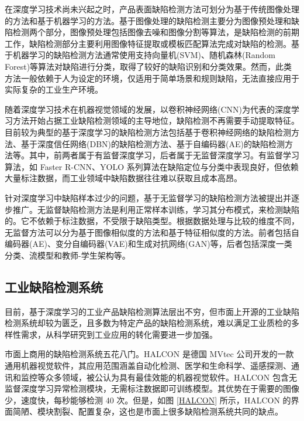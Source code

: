 \documentclass[
  ]{njuthesis}
\begin{document}
在深度学习技术尚未兴起之时，产品表面缺陷检测方法可划分为基于传统图像处理的方法和基于机器学习的方法。基于图像处理的缺陷检测主要分为图像预处理和缺陷检测两个部分，图像预处理包括图像去噪和图像分割等算法，是缺陷检测的前期工作，缺陷检测部分主要利用图像特征提取或模板匹配算法完成对缺陷的检测\cite{[4]}。基于机器学习的缺陷检测方法通常使用支持向量机(SVM)、随机森林(Random Forest)等算法对缺陷进行分类，取得了较好的缺陷识别和分类效果。然而，此类方法一般依赖于人为设定的环境，仅适用于简单场景和规则缺陷，无法直接应用于实际复杂的工业生产环境。

随着深度学习技术在机器视觉领域的发展，以卷积神经网络(CNN)为代表的深度学习方法开始占据工业缺陷检测领域的主导地位，缺陷检测不再需要手动提取特征。目前较为典型的基于深度学习的缺陷检测方法包括基于卷积神经网络的缺陷检测方法、基于深度信任网络(DBN)的缺陷检测方法、基于自编码器(AE)的缺陷检测方法等。其中，前两者属于有监督深度学习，后者属于无监督深度学习\cite{[4]}。有监督学习算法，如 Faster R-CNN、YOLO 系列算法在缺陷定位与分类中表现良好，但依赖大量标注数据，而工业领域中缺陷数据往往难以获取且成本高昂。

针对深度学习中缺陷样本过少的问题，基于无监督学习的缺陷检测方法被提出并逐步推广。无监督缺陷检测方法是利用正常样本训练，学习其分布模式，来检测缺陷的。它不依赖于标注数据，不受限于缺陷类型。根据数据处理与比较的维度不同，无监督方法可以分为基于图像相似度的方法和基于特征相似度的方法。前者包括自编码器(AE)、变分自编码器(VAE)和生成对抗网络(GAN)等，后者包括深度一类分类、流模型和教师-学生架构等\cite{[1]}。

\subsection{工业缺陷检测系统}

目前，基于深度学习的工业产品缺陷检测算法层出不穷，但市面上开源的工业缺陷检测系统却较为匮乏，且多数为特定产品的缺陷检测系统，难以满足工业质检的多样性需求，从科学研究到工业应用的转化需要进一步加强。

市面上商用的缺陷检测系统五花八门。HALCON 是德国 MVtec 公司开发的一款通用机器视觉软件，其应用范围涵盖自动化检测、医学和生命科学、遥感探测、通讯和监控等众多领域，被公认为具有最佳效能的机器视觉软件。HALCON 包含无监督深度学习异常检测模块，无需标注数据即可训练模型。其优势在于需要的图像少，速度快，每秒能够检测 40 次。但是，如图 \ref{HALCON} 所示，HALCON 的界面简陋、模块割裂、配置复杂，这也是市面上很多缺陷检测系统共同的缺点。
\end{document}
